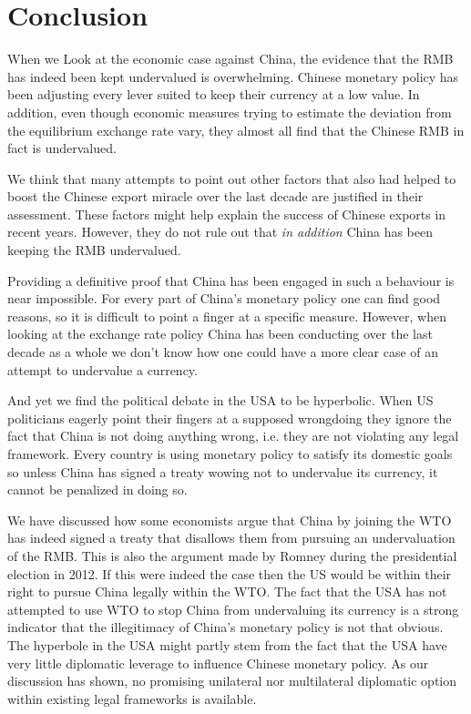 \section{Conclusion}
\label{sec:conclusion}

When we Look at the economic case against China, the evidence that the 
RMB has indeed been kept undervalued is overwhelming. Chinese monetary 
policy has been adjusting every lever suited to keep their currency at a 
low value. In addition, even though economic measures trying to estimate 
the deviation from the equilibrium exchange rate vary, they almost all 
find that the Chinese RMB in fact is undervalued.

We think that many attempts to point out other factors that also had 
helped to boost the Chinese export miracle over the last decade are 
justified in their assessment. These factors might help explain the 
success of Chinese exports in recent years. However, they do not rule 
out that \emph{in addition} China has been keeping the RMB undervalued.

Providing a definitive proof that China has been engaged in such a 
behaviour is near impossible. For every part of China's monetary policy 
one can find good reasons, so it is difficult to point a finger at a 
specific measure. However, when looking at the exchange rate policy 
China has been conducting over the last decade as a whole we don't know 
how one could have a more clear case of an attempt to undervalue a 
currency.

And yet we find the political debate in the USA to be hyperbolic. When 
US politicians eagerly point their fingers at a supposed wrongdoing they 
ignore the fact that China is not doing anything wrong, i.e. they are 
not violating any legal framework. Every country is using monetary 
policy to satisfy its domestic goals so unless China has signed a treaty 
wowing not to undervalue its currency, it cannot be penalized in doing 
so.  

We have discussed how some economists argue that China by joining the 
WTO has indeed signed a treaty that disallows them from pursuing an 
undervaluation of the RMB.  This is also the argument made by Romney 
during the presidential election in 2012. If this were indeed the case 
then the US would be within their right to pursue China legally within 
the WTO. The fact that the USA has not attempted to use WTO to stop 
China from undervaluing its currency is a strong indicator that the 
illegitimacy of China's monetary policy is not that obvious. The 
hyperbole in the USA might partly stem from the fact that the USA have 
very little diplomatic leverage to influence Chinese monetary policy. As 
our discussion has shown, no promising unilateral nor multilateral 
diplomatic option within existing legal frameworks is available. 

